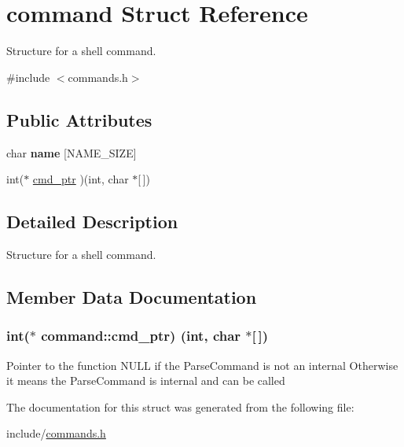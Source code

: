 \hypertarget{structcommand}{}\section{command Struct Reference}
\label{structcommand}


Structure for a shell command.  




{\ttfamily \#include $<$commands.\+h$>$}

\subsection*{Public Attributes}
\begin{DoxyCompactItemize}
\item 
char {\bfseries name} \mbox{[}N\+A\+M\+E\+\_\+\+S\+I\+ZE\mbox{]}\hypertarget{structcommand_a4f4bc4281d841a3209636f2b2c952cd6}{}\label{structcommand_a4f4bc4281d841a3209636f2b2c952cd6}

\item 
int($\ast$ \hyperlink{structcommand_a02fede77f4c99c73c2988c02fa874c8a}{cmd\+\_\+ptr} )(int, char $\ast$\mbox{[}$\,$\mbox{]})
\end{DoxyCompactItemize}


\subsection{Detailed Description}
Structure for a shell command. 

\subsection{Member Data Documentation}
\subsubsection[{\texorpdfstring{cmd\+\_\+ptr}{cmd_ptr}}]{\setlength{\rightskip}{0pt plus 5cm}int($\ast$ command\+::cmd\+\_\+ptr) (int, char $\ast$\mbox{[}$\,$\mbox{]})}\hypertarget{structcommand_a02fede77f4c99c73c2988c02fa874c8a}{}\label{structcommand_a02fede77f4c99c73c2988c02fa874c8a}
Pointer to the function N\+U\+LL if the Parse\+Command is not an internal Otherwise it means the Parse\+Command is internal and can be called 

The documentation for this struct was generated from the following file\+:\begin{DoxyCompactItemize}
\item 
include/\hyperlink{commands_8h}{commands.\+h}\end{DoxyCompactItemize}
